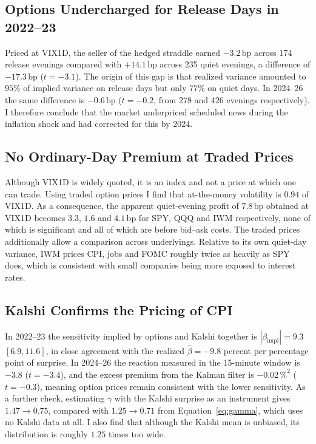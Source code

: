 \documentclass[10pt]{article}
\newcommand{\bp}{\,\mathrm{bp}}
\begin{document}
\subsection{Options Undercharged for Release Days in 2022--23}
Priced at VIX1D, the seller of the hedged straddle earned $-3.2\bp$ across 174 release evenings compared with $+14.1\bp$ across 235 quiet evenings, a difference of $-17.3\bp$ ($t=-3.1$). The origin of this gap is that realized variance amounted to $95\%$ of implied variance on release days but only $77\%$ on quiet days. In 2024--26 the same difference is $-0.6\bp$ ($t=-0.2$, from 278 and 426 evenings respectively). I therefore conclude that the market underpriced scheduled news during the inflation shock and had corrected for this by 2024.

\subsection{No Ordinary-Day Premium at Traded Prices}
Although VIX1D is widely quoted, it is an index and not a price at which one can trade. Using traded option prices I find that at-the-money volatility is $0.94$ of VIX1D. As a consequence, the apparent quiet-evening profit of $7.8\bp$ obtained at VIX1D becomes $3.3$, $1.6$ and $4.1\bp$ for SPY, QQQ and IWM respectively, none of which is significant and all of which are before bid--ask costs. The traded prices additionally allow a comparison across underlyings. Relative to its own quiet-day variance, IWM prices CPI, jobs and FOMC roughly twice as heavily as SPY does, which is consistent with small companies being more exposed to interest rates.

\subsection{Kalshi Confirms the Pricing of CPI}
In 2022--23 the sensitivity implied by options and Kalshi together is $|\beta_{\mathrm{impl}}|=9.3$ $[6.9,11.6]$, in close agreement with the realized $\hat\beta=-9.8$ percent per percentage point of surprise. In 2024--26 the reaction measured in the 15-minute window is $-3.8$ ($t=-3.4$), and the excess premium from the Kalman filter is $-0.02\,\%^2$ ($t=-0.3$), meaning option prices remain consistent with the lower sensitivity. As a further check, estimating $\gamma$ with the Kalshi surprise as an instrument gives $1.47\to0.75$, compared with $1.25\to0.71$ from Equation~\ref{eq:gamma}, which uses no Kalshi data at all. I also find that although the Kalshi mean is unbiased, its distribution is roughly $1.25$ times too wide.
\end{document}

